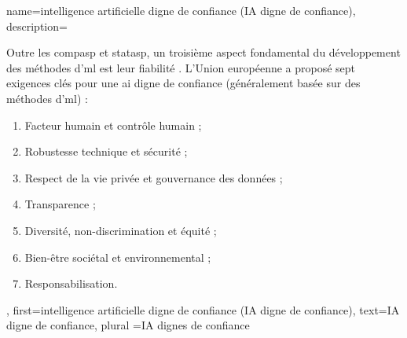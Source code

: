 {
	name={intelligence artificielle digne de confiance (IA digne de confiance)},
	description={Outre les \gls{compasp} et \gls{statasp}, un troisième aspect fondamental 
		du développement des méthodes d'\gls{ml} est leur fiabilité 
		\cite{pfau2024engineeringtrustworthyaideveloper}. 
		L’Union européenne a proposé sept exigences clés pour une \gls{ai} digne de confiance 
		(généralement basée sur des méthodes d'\gls{ml}) \cite{ALTAIEU} : 
		\begin{enumerate}[label=\arabic*)]
			\item Facteur humain et contrôle humain ;
			\item Robustesse technique et sécurité ;
			\item Respect de la vie privée et gouvernance des données ;
			\item Transparence ;
			\item Diversité, non-discrimination et équité ;
			\item Bien-être sociétal et environnemental ;
			\item Responsabilisation. 
		\end{enumerate}
	},
	first={intelligence artificielle digne de confiance (IA digne de confiance)},
	text={IA digne de confiance}, plural ={IA dignes de confiance}
}

